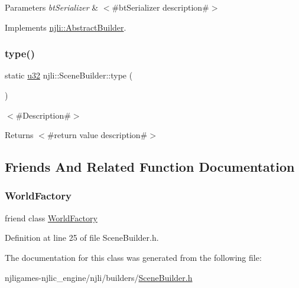 \begin{DoxyParams}{Parameters}
{\em bt\+Serializer} & $<$\#bt\+Serializer description\#$>$ \\
\hline
\end{DoxyParams}


Implements \mbox{\hyperlink{classnjli_1_1_abstract_builder_ab66b774e02ccb9da554c9aab7fa6d981}{njli\+::\+Abstract\+Builder}}.

\mbox{\label{classnjli_1_1_scene_builder_a35e422e5b7dad78581a730934fce3019}} 
\subsubsection{\texorpdfstring{type()}{type()}}
{\footnotesize\ttfamily static \mbox{\hyperlink{_util_8h_a10e94b422ef0c20dcdec20d31a1f5049}{u32}} njli\+::\+Scene\+Builder\+::type (\begin{DoxyParamCaption}{ }\end{DoxyParamCaption})\hspace{0.3cm}{\ttfamily [static]}}

$<$\#\+Description\#$>$

\begin{DoxyReturn}{Returns}
$<$\#return value description\#$>$ 
\end{DoxyReturn}


\subsection{Friends And Related Function Documentation}
\mbox{\label{classnjli_1_1_scene_builder_acb96ebb09abe8f2a37a915a842babfac}} 
\subsubsection{\texorpdfstring{World\+Factory}{WorldFactory}}
{\footnotesize\ttfamily friend class \mbox{\hyperlink{classnjli_1_1_world_factory}{World\+Factory}}\hspace{0.3cm}{\ttfamily [friend]}}



Definition at line 25 of file Scene\+Builder.\+h.



The documentation for this class was generated from the following file\+:\begin{DoxyCompactItemize}
\item 
njligames-\/njlic\+\_\+engine/njli/builders/\mbox{\hyperlink{_scene_builder_8h}{Scene\+Builder.\+h}}\end{DoxyCompactItemize}
